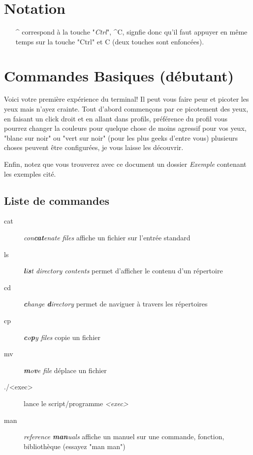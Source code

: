 \documentclass[french, a4paper, 12pt, titlepage]{article}
\begin{document}
\section{Notation}
\begin{enumerate}
\item[\^{}] correspond à la touche "\emph{Ctrl}", \^{}C, signfie donc qu'il faut appuyer en même temps sur la touche "Ctrl" et C (deux touches sont enfoncées).
\end{enumerate}

\section{Commandes Basiques (débutant)}
Voici votre première expérience du terminal!
Il peut vous faire peur et picoter les yeux mais n'ayez crainte. Tout d'abord commençons par ce picotement des yeux, en faisant un click droit et en allant dans profils, préférence du profil vous pourrez changer la couleurs pour quelque chose de moins agressif pour vos yeux, "blanc sur noir" ou "vert sur noir" (pour les plus geeks d'entre vous) plusieurs choses peuvent être configurées, je vous laisse les découvrir.

Enfin, notez que vous trouverez avec ce document un dossier \emph{Exemple} contenant les exemples cité.

\subsection{Liste de commandes}
\begin{description}
\item[cat] \emph{con\textbf{cat}enate files} affiche un fichier sur l'entrée standard
\item[ls] \emph{\textbf{l}i\textbf{s}t directory contents} permet d'afficher le contenu d'un répertoire
\item[cd] \emph{\textbf{c}hange \textbf{d}irectory} permet de naviguer à travers les répertoires
\item[cp] \emph{\textbf{c}o\textbf{p}y files} copie un fichier
\item[mv] \emph{\textbf{m}o\textbf{v}e file} déplace un fichier
\item[./<exec>] lance le script/programme \emph{<exec>}
\item[man] \emph{reference \textbf{man}uals} affiche un manuel sur une commande, fonction, bibliothèque (essayez "man man")
\end{description}
\end{document}
